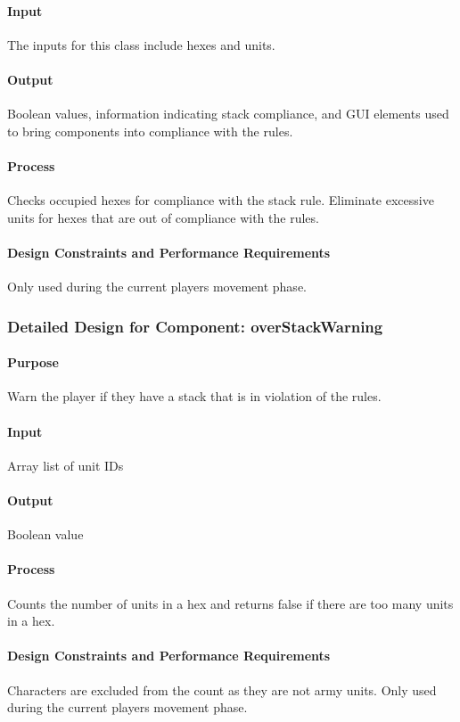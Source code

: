 \documentclass[12pt,a4paper,titlepage]{article}
\begin{document}
\paragraph{Input} The inputs for this class include hexes and units.
\paragraph{Output} Boolean values, information indicating stack compliance, and GUI elements used to bring components into compliance with the rules.
\paragraph{Process} Checks occupied hexes for compliance with the stack rule. Eliminate excessive units for hexes that are out of compliance with the rules.
\paragraph{Design Constraints and Performance Requirements} Only used during the current players movement phase. 

\subsubsection{Detailed Design for Component: overStackWarning}
\paragraph{Purpose} Warn the player if they have a stack that is in violation of the rules.
\paragraph{Input} Array list of unit IDs
\paragraph{Output} Boolean value
\paragraph{Process} Counts the number of units in a hex and returns false if there are too many units in a hex.
\paragraph{Design Constraints and Performance Requirements} Characters are excluded from the count as they are not army units.  Only used during the current players movement phase.
\end{document}
